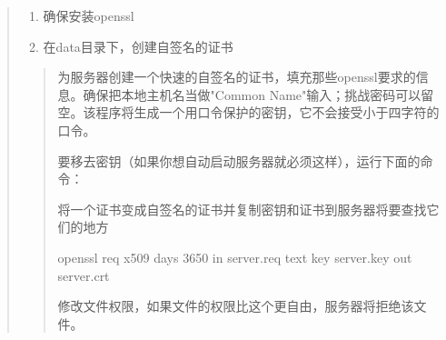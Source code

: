\documentclass[a4,10pt,oneside,english]{sphinxmanual}
\begin{document}
\begin{quote}
\begin{enumerate}
%
\item {} 
确保安装openssl

\item {} 
在data目录下，创建自签名的证书

\end{enumerate}
\begin{quote}

为服务器创建一个快速的自签名的证书，填充那些openssl要求的信息。确保把本地主机名当做"Common Name"输入；挑战密码可以留空。该程序将生成一个用口令保护的密钥，它不会接受小于四字符的口令。

\begin{sphinxVerbatim}[commandchars=\\\{\}]
     
\end{sphinxVerbatim}

要移去密钥（如果你想自动启动服务器就必须这样），运行下面的命令：

\begin{sphinxVerbatim}[commandchars=\\\{\}]
     
 
\end{sphinxVerbatim}

将一个证书变成自签名的证书并复制密钥和证书到服务器将要查找它们的地方

\begin{sphinxVerbatim}[commandchars=\\\{\}]
openssl req \PYGZhy{}x509 \PYGZhy{}days 3650 \PYGZhy{}in server.req \PYGZhy{}text \PYGZhy{}key server.key \PYGZhy{}out server.crt

修改文件权限，如果文件的权限比这个更自由，服务器将拒绝该文件。
\end{sphinxVerbatim}

\begin{sphinxVerbatim}[commandchars=\\\{\}]
  
\end{sphinxVerbatim}


\end{quote}
\end{quote}
\end{document}
